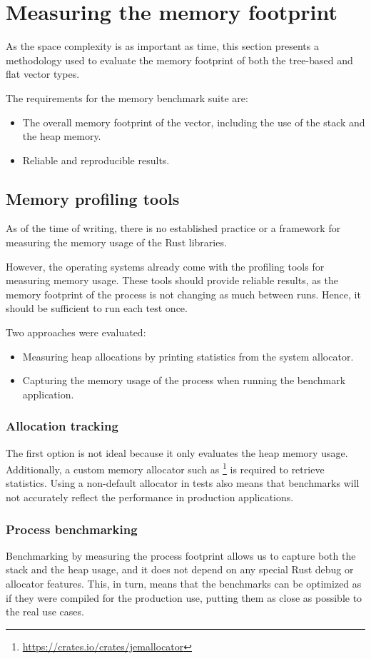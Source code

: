 \section{Measuring the memory footprint}
As the space complexity is as important as time, this section presents a methodology used to evaluate the memory footprint of both the tree-based and flat vector types.

The requirements for the memory benchmark suite are:
\begin{itemize}
    \item The overall memory footprint of the vector, including the use of the stack and the heap memory.
    \item Reliable and reproducible results.
\end{itemize}

\subsection{Memory profiling tools}
As of the time of writing, there is no established practice or a framework for measuring the memory usage of the Rust libraries.

However, the operating systems already come with the profiling tools for measuring memory usage. These tools should provide reliable results, as the memory footprint of the process is not changing as much between runs. Hence, it should be sufficient to run each test once.

Two approaches were evaluated:
\begin{itemize}
    \item Measuring heap allocations by printing statistics from the system allocator.
    \item Capturing the memory usage of the process when running the benchmark application.
\end{itemize}

\subsubsection*{Allocation tracking}
The first option is not ideal because it only evaluates the heap memory usage. Additionally, a custom memory allocator such as \footnote{\url{https://crates.io/crates/jemallocator}} is required to retrieve statistics. Using a non-default allocator in tests also means that benchmarks will not accurately reflect the performance in production applications.

\subsubsection*{Process benchmarking}
Benchmarking by measuring the process footprint allows us to capture both the stack and the heap usage, and it does not depend on any special Rust debug or allocator features. This, in turn, means that the benchmarks can be optimized as if they were compiled for the production use, putting them as close as possible to the real use cases.

